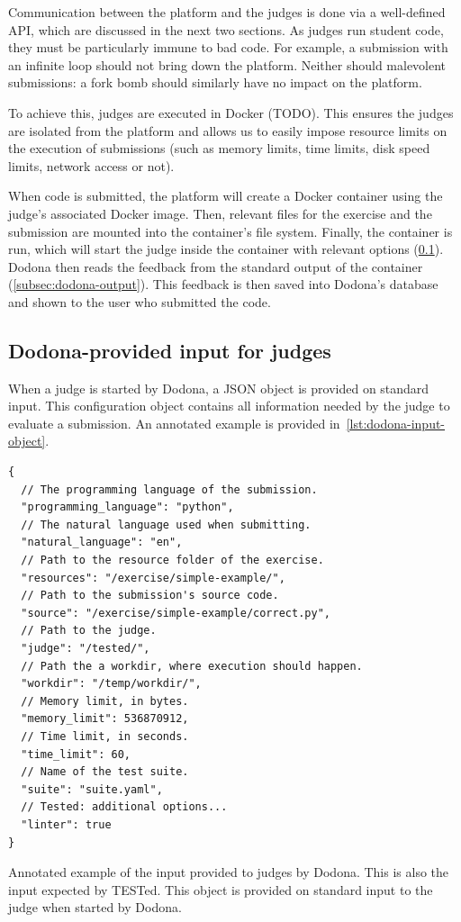\documentclass[../main]{subfiles}
\begin{document}
Communication between the platform and the judges is done via a well-defined API, which are discussed in the next two sections.
As judges run student code, they must be particularly immune to bad code.
For example, a submission with an infinite loop should not bring down the platform.
Neither should malevolent submissions: a fork bomb should similarly have no impact on the platform.

To achieve this, judges are executed in Docker (TODO).
This ensures the judges are isolated from the platform and allows us to easily impose resource limits on the execution of submissions (such as memory limits, time limits, disk speed limits, network access or not).

When code is submitted, the platform will create a Docker container using the judge's associated Docker image.
Then, relevant files for the exercise and the submission are mounted into the container's file system.
Finally, the container is run, which will start the judge inside the container with relevant options (\cref{subsec:dodona-input}).
Dodona then reads the feedback from the standard output of the container (\cref{subsec:dodona-output}).
This feedback is then saved into Dodona's database and shown to the user who submitted the code.

\subsection{Dodona-provided input for judges}\label{subsec:dodona-input}

When a judge is started by Dodona, a JSON object is provided on standard input.
This configuration object contains all information needed by the judge to evaluate a submission.
An annotated example is provided in~\cref{lst:dodona-input-object}.

\begin{listing}
    \begin{verbatim}
{
  // The programming language of the submission.
  "programming_language": "python",
  // The natural language used when submitting.
  "natural_language": "en",
  // Path to the resource folder of the exercise.
  "resources": "/exercise/simple-example/",
  // Path to the submission's source code.
  "source": "/exercise/simple-example/correct.py",
  // Path to the judge.
  "judge": "/tested/",
  // Path the a workdir, where execution should happen.
  "workdir": "/temp/workdir/",
  // Memory limit, in bytes.
  "memory_limit": 536870912,
  // Time limit, in seconds.
  "time_limit": 60,
  // Name of the test suite.
  "suite": "suite.yaml",
  // Tested: additional options...
  "linter": true
}
    \end{verbatim}
    \caption{
        Annotated example of the input provided to judges by Dodona.
        This is also the input expected by TESTed.
        This object is provided on standard input to the judge when started by Dodona.
    }
    \label{lst:dodona-input-object}
\end{listing}
\end{document}
